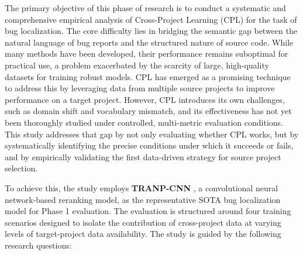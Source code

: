 \documentclass[12pt,table,xcdraw]{article}
\begin{document}
The primary objective of this phase of research is to conduct a systematic and comprehensive empirical analysis of Cross-Project Learning (CPL) for the task of bug localization. The core difficulty lies in bridging the semantic gap between the natural language of bug reports and the structured nature of source code. While many methods have been developed, their performance remains suboptimal for practical use, a problem exacerbated by the scarcity of large, high-quality datasets for training robust models. CPL has emerged as a promising technique to address this by leveraging data from multiple source projects to improve performance on a target project. However, CPL introduces its own challenges, such as domain shift and vocabulary mismatch, and its effectiveness has not yet been thoroughly studied under controlled, multi-metric evaluation conditions. This study addresses that gap by not only evaluating whether CPL works, but by systematically identifying the precise conditions under which it succeeds or fails, and by empirically validating the first data-driven strategy for source project selection.

To achieve this, the study employs \textbf{TRANP-CNN} \cite{huo2019deep}, a convolutional neural network-based reranking model, as the representative SOTA bug localization model for Phase 1 evaluation. The evaluation is structured around four training scenarios designed to isolate the contribution of cross-project data at varying levels of target-project data availability. The study is guided by the following research questions:
\end{document}
